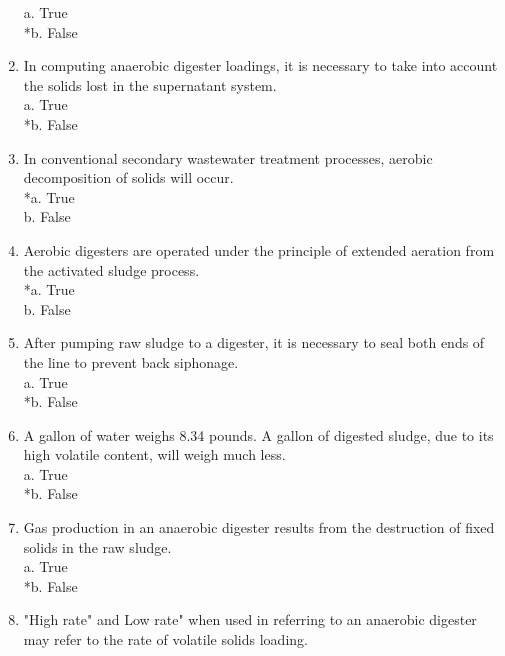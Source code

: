 \documentclass{article}
\begin{document}
\begin{enumerate}
a. True \\
*b. False \\

\item  In computing anaerobic digester loadings, it is necessary to take into account the solids lost in the supernatant system. \\

a. True \\
*b. False \\

\item  In conventional secondary wastewater treatment processes, aerobic decomposition of solids will occur. \\

*a. True \\
b. False \\

\item  Aerobic digesters are operated under the principle of extended aeration from the activated sludge process. \\

*a. True \\
b. False \\

\item  After pumping raw sludge to a digester, it is necessary to seal both ends of the line to prevent back siphonage. \\

a. True \\
*b. False \\

\item  A gallon of water weighs 8.34 pounds.  A gallon of digested sludge, due to its high volatile content, will weigh much less. \\

a. True \\
*b. False \\

\item  Gas production in an anaerobic digester results from the destruction of fixed solids in the raw sludge. \\

a. True \\
*b. False \\

\item  "High rate" and Low rate" when used in referring to an anaerobic digester may refer to the rate of volatile solids loading. \\


\end{enumerate}
\end{document}

